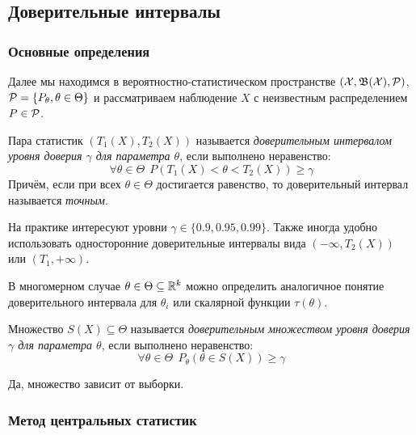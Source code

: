 \subsection{Доверительные интервалы}

\subsubsection{Основные определения}

\begin{note}
	Далее мы находимся в вероятностно-статистическом пространстве $(\mathcal{X}, \mathfrak{B}(\mathcal{X}), \mathcal{P})$, $\mathcal{P} = \{P_\theta, \theta \in \Theta\}$ и рассматриваем наблюдение $X$ с неизвестным распределением $P \in \mathcal{P}$.
\end{note}

\begin{definition}
	Пара статистик $(T_1(X), T_2(X))$ называется \textit{доверительным интервалом уровня доверия $\gamma$ для параметра $\theta$}, если выполнено неравенство:
	\[
		\forall \theta \in \Theta\ \ P(T_1(X) < \theta < T_2(X)) \ge \gamma
	\]
	Причём, если при всех $\theta \in \Theta$ достигается равенство, то доверительный интервал называется \textit{точным}.
\end{definition}

\begin{note}
	На практике интересуют уровни $\gamma \in \{0.9, 0.95, 0.99\}$. Также иногда удобно использовать односторонние доверительные интервалы вида $(-\infty, T_2(X))$ или $(T_1, +\infty)$.
\end{note}

\begin{note}
	В многомерном случае $\theta \in \Theta \subseteq \mathbb{R}^k$ можно определить аналогичное понятие доверительного интервала для $\theta_i$ или скалярной функции $\tau(\theta)$.
\end{note}

\begin{definition}
	Множество $S(X) \subseteq \Theta$ называется \textit{доверительным множеством уровня доверия $\gamma$ для параметра $\theta$}, если выполнено неравенство:
	\[
		\forall \theta \in \Theta\ \ P_\theta(\theta \in S(X)) \ge \gamma
	\]
\end{definition}

\begin{anote}
	Да, множество зависит от выборки.
\end{anote}

\subsubsection{Метод центральных статистик}

